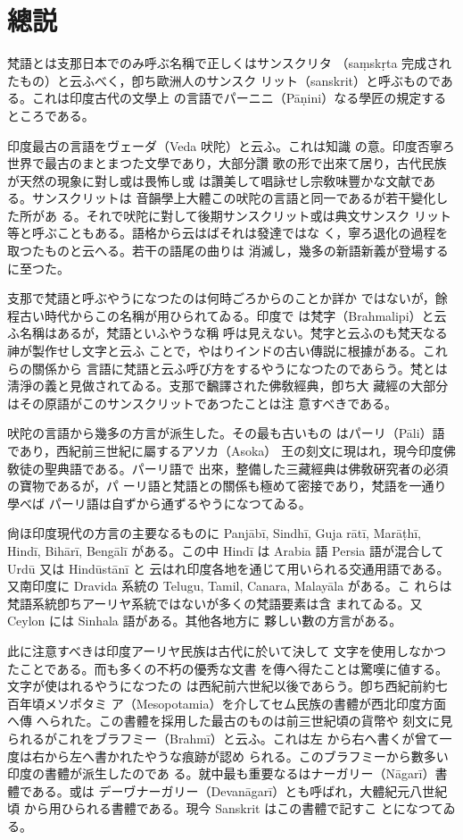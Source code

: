 
\chapter*{總説}
\label{cha:general}

\numberParagraph
梵語とは支那日本でのみ呼ぶ名稱で正しくはサンスクリタ
（saṃskṛta 完成されたもの）と云ふべく，卽ち歐洲人のサンスク
リット（sanskrit）と呼ぶものである。これは印度古代の文學上
の言語でパーニニ（Pāṇini）なる學匠の規定するところである。

印度最古の言語をヴェーダ（Veda 吠陀）と云ふ。これは知識
の意。印度否寧ろ世界で最古のまとまつた文學であり，大部分讚
歌の形で出來て居り，古代民族が天然の現象に對し或は畏怖し或
は讚美して唱詠せし宗敎味豐かな文献である。サンスクリットは
音韻學上大體この吠陀の言語と同一であるが若干變化した所があ
る。それで吠陀に對して後期サンスクリット或は典文サンスク
リット等と呼ぶこともある。語格から云はばそれは發達ではな
く，寧ろ退化の過程を取つたものと云へる。若干の語尾の曲りは
消滅し，幾多の新語新義が登場するに至つた。

支那で梵語と呼ぶやうになつたのは何時ごろからのことか詳か
ではないが，餘程古い時代からこの名稱が用ひられてゐる。印度で
は梵字（Brahmalipi）と云ふ名稱はあるが，梵語といふやうな稱
呼は見えない。梵字と云ふのも梵天なる神が製作せし文字と云ふ
ことで，やはりインドの古い傳説に根據がある。これらの關係から
言語に梵語と云ふ呼び方をするやうになつたのであらう。梵とは
淸淨の義と見做されてゐる。支那で飜譯された佛敎經典，卽ち大
藏經の大部分はその原語がこのサンスクリットであつたことは注
意すべきである。

\numberParagraph
吠陀の言語から幾多の方言が派生した。その最も古いもの
はパーリ（Pāli）語であり，西紀前三世紀に屬するアソカ（Asoka）
王の刻文に現はれ，現今印度佛敎徒の聖典語である。パーリ語で
出來，整備した三藏經典は佛敎硏究者の必須の寶物であるが，パ
ーリ語と梵語との關係も極めて密接であり，梵語を一通り學べば
パーリ語は自ずから通ずるやうになつてゐる。

尙ほ印度現代の方言の主要なるものに Panjābī, Sindhī, Guja\-%
rātī, Marāṭhī, Hindī, Bihārī, Bengālī がある。この中 Hindī
は Arabia 語 Persia 語が混合して Urdū 又は Hindūstānī と
云はれ印度各地を通じて用いられる交通用語である。又南印度に
Dravida 系統の Telugu, Tamil, Canara, Malayāla がある。こ
れらは梵語系統卽ちアーリヤ系統ではないが多くの梵語要素は含
まれてゐる。又 Ceylon には Sinhala 語がある。其他各地方に
夥しい數の方言がある。

\numberParagraph
此に注意すべきは印度アーリヤ民族は古代に於いて決して
文字を使用しなかつたことである。而も多くの不朽の優秀な文書
を傳へ得たことは驚嘆に値する。文字が使はれるやうになつたの
は西紀前六世紀以後であらう。卽ち西紀前約七百年頃メソポタミ
ア（Mesopotamia）を介してセム民族の書體が西北印度方面へ傳
へられた。この書體を採用した最古のものは前三世紀頃の貨幣や
刻文に見られるがこれをブラフミー（Brahmī）と云ふ。これは左
から右へ書くが曾て一度は右から左へ書かれたやうな痕跡が認め
られる。このブラフミーから數多い印度の書體が派生したのであ
る。就中最も重要なるはナーガリー（Nāgarī）書體である。或は
デーヷナーガリー（Devanāgarī）とも呼ばれ，大體紀元八世紀頃
から用ひられる書體である。現今 Sanskrit はこの書體で記すこ
とになつてゐる。

